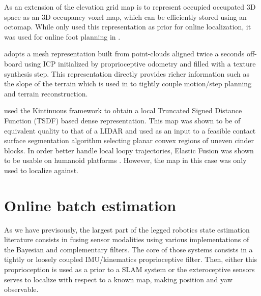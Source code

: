 As an extension of the elevation grid map is to represent occupied occupated 3D space as an 3D occupancy voxel map, which can be efficiently stored using an octomap.
While \cite{fallon2014drift} only used this representation as prior for online localization, it was used for online foot planning in \cite{winkler2015planning, mastalli2015line}. 

\cite{kolter2009stereo} adopts a mesh representation built from point-clouds aligned twice a seconds off-board using ICP initialized by proprioceptive odometry and filled with
a texture synthesis step. This representation directly provides richer information such as the slope of the terrain which is used in \cite{mastalli2020motion} to 
tightly couple motion/step planning and terrain reconstruction. 


\cite{fallon2015continuous} used the Kintinuous framework to obtain a local Truncated Signed Distance Function (TSDF) based dense representation. This map was
shown to be of equivalent quality to that of a LIDAR and used as an input to a feasible contact surface segmentation algorithm selecting planar convex regions of uneven cinder blocks. 
In order better handle local loopy trajectories, Elastic Fusion was shown to be usable on humanoid platforms \cite{scona2017direct}. However, the map in this case was only used to localize against.









\section{Online batch estimation}
As we have previsously, the largest part of the legged robotics state estimation literature consists in fusing sensor modalities using various 
implementations of the Bayesian and complementary filters. The core of those systems consists in a tightly or loosely coupled IMU/kinematics proprioceptive
filter. Then, either this proprioception is used as a prior to a SLAM system or the exteroceptive sensors serves to localize with respect to a known map,
making position and yaw observable.

